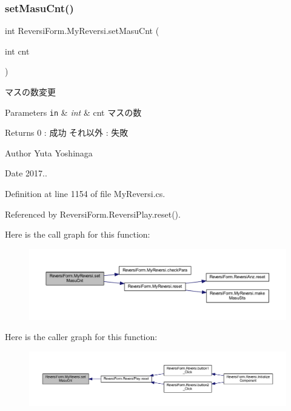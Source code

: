 \subsubsection{\texorpdfstring{set\+Masu\+Cnt()}{setMasuCnt()}}
{\footnotesize\ttfamily int Reversi\+Form.\+My\+Reversi.\+set\+Masu\+Cnt (\begin{DoxyParamCaption}\item[{int}]{cnt }\end{DoxyParamCaption})}



マスの数変更 


\begin{DoxyParams}[1]{Parameters}
\mbox{\tt in}  & {\em int} & cnt マスの数 \\
\hline
\end{DoxyParams}
\begin{DoxyReturn}{Returns}
0 \+: 成功 それ以外 \+: 失敗 
\end{DoxyReturn}
\begin{DoxyAuthor}{Author}
Yuta Yoshinaga 
\end{DoxyAuthor}
\begin{DoxyDate}{Date}
2017.. 
\end{DoxyDate}


Definition at line 1154 of file My\+Reversi.\+cs.



Referenced by Reversi\+Form.\+Reversi\+Play.\+reset().

Here is the call graph for this function\+:\nopagebreak
\begin{figure}[H]
\begin{center}
\leavevmode
\includegraphics[width=350pt]{class_reversi_form_1_1_my_reversi_af9573f1da0d89180a4dbbd98d41a05fb_cgraph}
\end{center}
\end{figure}
Here is the caller graph for this function\+:\nopagebreak
\begin{figure}[H]
\begin{center}
\leavevmode
\includegraphics[width=350pt]{class_reversi_form_1_1_my_reversi_af9573f1da0d89180a4dbbd98d41a05fb_icgraph}
\end{center}
\end{figure}
\mbox{\label{class_reversi_form_1_1_my_reversi_a1f7ba86f6e8d5dd2fa472a8994e4e3c5}} 
